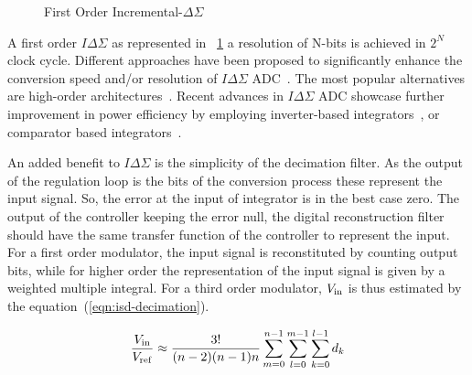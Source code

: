 \begin{figure}[htp]
	\centering
	\resizebox{\textwidth}{!} {}
	\caption{First Order Incremental-\(\Delta\Sigma \)}
	\label{fig:isd_first_order_principle}
\end{figure}

A first order \(I\Delta\Sigma \) as represented in \figurename~\ref{fig:isd_first_order_principle} a resolution of N-bits is achieved in \(2^N \) clock cycle. Different approaches have been proposed to significantly enhance the conversion speed and/or resolution of \(I\Delta\Sigma \) ADC~\cite{Markus2004,Quiquempoix2006,Caldwell2010}. The most popular alternatives are high-order architectures~\cite{Au1997,Babanezhad1991,Baird1996}. Recent advances in \(I\Delta\Sigma \) ADC showcase further improvement in power efficiency by employing inverter-based integrators~\cite{Chae2009}, or comparator based integrators~\cite{Yamamoto2012}.

An added benefit to \(I\Delta\Sigma \) is the simplicity of the decimation filter. As the output of the regulation loop is the bits of the conversion process these represent the input signal. So, the error at the input of integrator is in the best case zero. The output of the controller keeping the error null, the digital reconstruction filter should have the same transfer function of the controller to represent the input. For a first order modulator, the input signal is reconstituted by counting output bits, while for higher order the representation of the input signal is given by a weighted multiple integral. For a third order modulator, \(V_{\rm in}\) is thus estimated by the equation~(\ref{eqn:isd-decimation}).

\begin{equation}
	\frac{V_{\rm in}}{V_{\rm ref}}\approx \frac{3!}{(n-2)(n-1)n}\sum_{m=0}^{n-1}\sum_{l=0}^{m-1}\sum_{k=0}^{l-1}d_{k}
\label{eqn:isd-decimation}
\end{equation}


